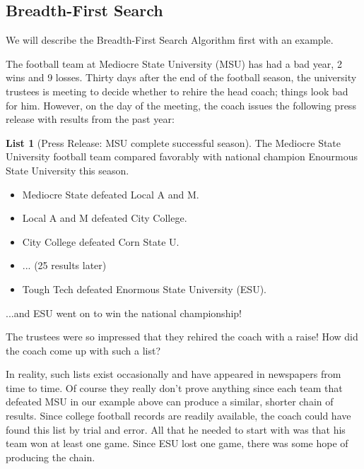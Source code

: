 \documentclass[10pt,]{book}
\theoremstyle{plain}
\theoremstyle{definition}
\theoremstyle{definition}
\theoremstyle{definition}
\theoremstyle{definition}
\theoremstyle{definition}
\newtheorem{listwrapper}[theorem]{List}
\numberwithin{equation}{section}
\begin{document}
\subsection[Breadth-First Search]{Breadth-First Search}\label{ss-breadth-first-search}
We will describe the Breadth-First Search Algorithm first with an example.%
\par
 The football team at Mediocre State University (MSU) has had a bad year, 2 wins and 9 losses. Thirty days after the end of the football season, the university trustees is meeting to decide whether to rehire the head coach; things look bad for him. However, on the day
of the meeting, the coach issues the following press release with results from the past year:%
\begin{listwrapper}[Press Release: MSU complete successful season]\label{list-4}
\typeout{************************************************}
\typeout{************************************************}
The Mediocre State University football team compared favorably with national champion Enourmous State University this season.%
\leavevmode%
\begin{itemize}[label=\textbullet]
\item{}Mediocre State defeated Local A and M.%
\item{}Local A and M defeated City College.%
\item{}City College defeated Corn State U.%
\item{}... (25 results later)%
\item{}Tough Tech defeated Enormous State University (ESU).%
\end{itemize}
\typeout{************************************************}
\typeout{************************************************}
\bigbreak
...and ESU went on to win the national championship!%
\end{listwrapper}
\par
The trustees were so impressed that they rehired the coach with a raise! How did the coach come up with such a list?%
\par
In reality, such lists exist occasionally and have appeared in newspapers from time to time. Of course they really don't prove anything since each team that defeated MSU in our example above can produce a similar, shorter chain of results. Since college football records are readily available, the coach could have found this list by trial and error. All that he needed to start with was that his team won at least one game. Since ESU lost one game, there was some hope of producing the chain.%
\end{document}
